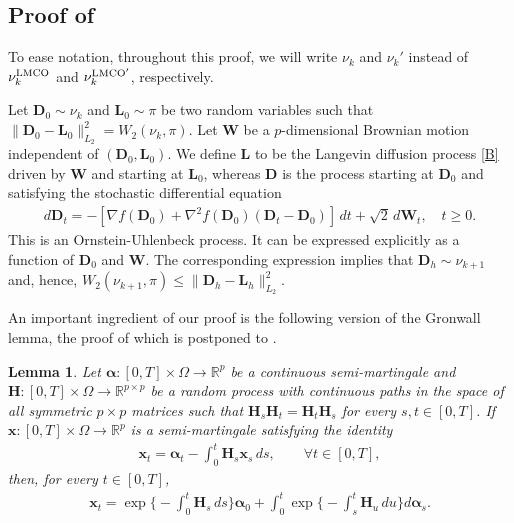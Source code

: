 \documentclass[aoap,preprint,reqno,a4paper]{imsart} %
\newcommand{\RR}{\mathbb{R}}
\newcommand{\balpha}{\boldsymbol{\alpha}}
\newcommand{\bfH}{\mathbf H}
\newcommand{\bW}{\boldsymbol W\!}
\newcommand{\bD}{\boldsymbol D}
\newcommand{\bL}{\boldsymbol L}
\newcommand{\bx}{\boldsymbol x}
\newtheorem{lemma}{Lemma}
\begin{document}
\subsection{Proof of }

To ease notation, throughout this proof, we will write $\nu_k$ and $\nu_k'$ instead of
$\nu_k^{\rm LMCO}$ and $\nu_k^{\rm LMCO'}$, respectively.

Let $\bD_0\sim \nu_k$ and $\bL_0\sim \pi$
be two random  variables such that $\|\bD_0-\bL_0\|_{L_2}^2= W_2(\nu_k,\pi)$. Let $\bW$ be a $p$-dimensional
Brownian motion independent of $(\bD_0,\bL_0)$. We define $\bL$ to be the Langevin
diffusion process \eqref{B} driven by $\bW$ and starting at $\bL_0$, whereas $\bD$ is the
process starting at $\bD_0$ and satisfying the stochastic differential equation
\begin{align}
d\bD_t = -[\nabla f(\bD_0) + \nabla^2 f(\bD_0)(\bD_t-\bD_0)]\,dt+\sqrt{2}\,d\bW_t,\quad t\ge 0.
\end{align}
This is an Ornstein-Uhlenbeck process. It can be expressed explicitly as a function of
$\bD_0$ and $\bW$. The corresponding expression implies that $\bD_h\sim \nu_{k+1}$ and, hence,
$W_2(\nu_{k+1},\pi)\le \|\bD_h-\bL_h\|_{L_2}^2$.

An important ingredient of our proof is the following version of the Gronwall lemma,
the proof of which is postponed to .

\begin{lemma}\label{lemG}
Let $\balpha:[0,T]\times\Omega\to \RR^p$ be a continuous semi-martingale and
$\bfH:[0,T]\times\Omega\to\RR^{p\times p}$ be a random process with continuous paths
in the space of all symmetric $p\times p$ matrices such that $\bfH_s\bfH_t = \bfH_t\bfH_s$
for every $s,t\in[0,T]$. If $\bx:[0,T]\times\Omega\to \RR^p$ is a semi-martingale satisfying
the identity
\begin{align}\label{recx}
\bx_t = \balpha_t -\int_0^t \bfH_s\bx_s\,ds,\qquad \forall t\in[0,T],
\end{align}
then, for every $t\in[0,T]$,
\begin{align}\label{finalx}
\bx_t = \exp\Big\{-\int_0^t\bfH_s\,ds\Big\} \balpha_0 + \int_0^t \exp\Big\{-\int_s^t\bfH_u\,du\Big\}d\balpha_s.
\end{align}
\end{lemma}
\end{document}
